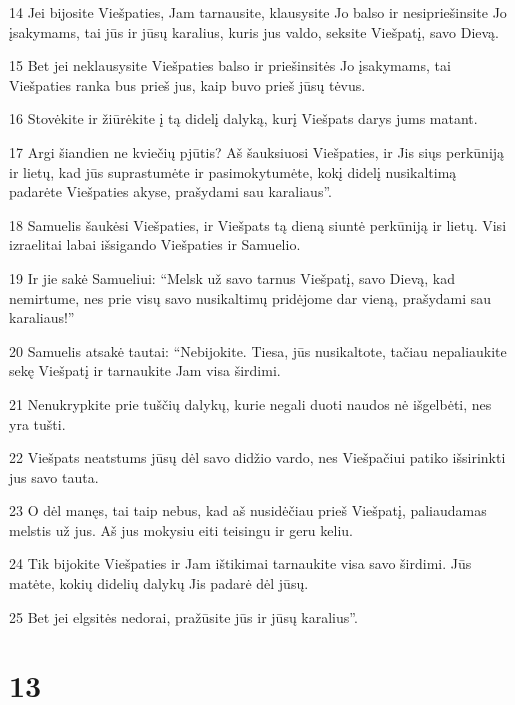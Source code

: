 \par 14 Jei bijosite Viešpaties, Jam tarnausite, klausysite Jo balso ir nesipriešinsite Jo įsakymams, tai jūs ir jūsų karalius, kuris jus valdo, seksite Viešpatį, savo Dievą. 
\par 15 Bet jei neklausysite Viešpaties balso ir priešinsitės Jo įsakymams, tai Viešpaties ranka bus prieš jus, kaip buvo prieš jūsų tėvus. 
\par 16 Stovėkite ir žiūrėkite į tą didelį dalyką, kurį Viešpats darys jums matant. 
\par 17 Argi šiandien ne kviečių pjūtis? Aš šauksiuosi Viešpaties, ir Jis siųs perkūniją ir lietų, kad jūs suprastumėte ir pasimokytumėte, kokį didelį nusikaltimą padarėte Viešpaties akyse, prašydami sau karaliaus”. 
\par 18 Samuelis šaukėsi Viešpaties, ir Viešpats tą dieną siuntė perkūniją ir lietų. Visi izraelitai labai išsigando Viešpaties ir Samuelio. 
\par 19 Ir jie sakė Samueliui: “Melsk už savo tarnus Viešpatį, savo Dievą, kad nemirtume, nes prie visų savo nusikaltimų pridėjome dar vieną, prašydami sau karaliaus!” 
\par 20 Samuelis atsakė tautai: “Nebijokite. Tiesa, jūs nusikaltote, tačiau nepaliaukite sekę Viešpatį ir tarnaukite Jam visa širdimi. 
\par 21 Nenukrypkite prie tuščių dalykų, kurie negali duoti naudos nė išgelbėti, nes yra tušti. 
\par 22 Viešpats neatstums jūsų dėl savo didžio vardo, nes Viešpačiui patiko išsirinkti jus savo tauta. 
\par 23 O dėl manęs, tai taip nebus, kad aš nusidėčiau prieš Viešpatį, paliaudamas melstis už jus. Aš jus mokysiu eiti teisingu ir geru keliu. 
\par 24 Tik bijokite Viešpaties ir Jam ištikimai tarnaukite visa savo širdimi. Jūs matėte, kokių didelių dalykų Jis padarė dėl jūsų. 
\par 25 Bet jei elgsitės nedorai, pražūsite jūs ir jūsų karalius”.



\chapter{13}

